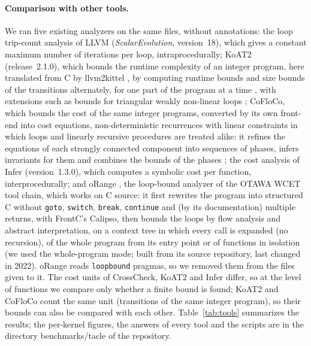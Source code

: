 \documentclass[oneside,english]{amsart}
\numberwithin{equation}{section}
\numberwithin{figure}{section}
\theoremstyle{plain}
\theoremstyle{definition}
\theoremstyle{plain}
\theoremstyle{remark}
\theoremstyle{plain}
\theoremstyle{definition}
\theoremstyle{plain}
\theoremstyle{remark}
\newcommand{\lean}[1]{{\ttfamily\small #1}}
\begin{document}
\paragraph{Comparison with other tools.}
We ran five existing analyzers on the same files, without annotations: the loop trip-count analysis of LLVM \cite{lattner2004llvm} (\emph{ScalarEvolution}, version~18), which gives a constant maximum number of iterations per loop, intraprocedurally; KoAT2 (release~2.1.0), which bounds the runtime complexity of an integer program, here translated from C by llvm2kittel \cite{falke2011termination}, by computing runtime bounds and size bounds of the transitions alternately, for one part of the program at a time \cite{brockschmidt2016analyzing}, with extensions such as bounds for triangular weakly non-linear loops \cite{lommen2022automatic}; CoFloCo, which bounds the cost of the same integer programs, converted by its own front-end into cost equations, non-deterministic recurrences with linear constraints in which loops and linearly recursive procedures are treated alike: it refines the equations of each strongly connected component into sequences of phases, infers invariants for them and combines the bounds of the phases \cite{floresmontoya2014cofloco}; the cost analysis of Infer \cite{infercost} (version~1.3.0), which computes a symbolic cost per function, interprocedurally; and oRange \cite{demichiel2008orange}, the loop-bound analyzer of the OTAWA WCET tool chain, which works on C source: it first rewrites the program into structured C without \texttt{goto}, \texttt{switch}, \texttt{break}, \texttt{continue} and (by its documentation) multiple returns, with FrontC's Calipso, then bounds the loops by flow analysis and abstract interpretation, on a context tree in which every call is expanded (no recursion), of the whole program from its entry point or of functions in isolation (we used the whole-program mode; built from its source repository, last changed in 2022). oRange reads \texttt{loopbound} pragmas, so we removed them from the files given to it. The cost units of CrossCheck, KoAT2 and Infer differ, so at the level of functions we compare only whether a finite bound is found; KoAT2 and CoFloCo count the same unit (transitions of the same integer program), so their bounds can also be compared with each other. Table~\ref{tab:tools} summarizes the results; the per-kernel figures, the answers of every tool and the scripts are in the directory \lean{benchmarks/tacle} of the repository.
\end{document}
